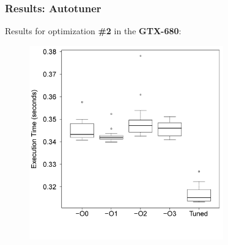 \documentclass[10pt, compress]{beamer}
\begin{document}
\begin{frame}[fragile]
  \frametitle{Results: Autotuner}
  Results for optimization \alert{\bf \#2}
  in the \alert{\bf GTX-680}:

    \begin{figure}[htpb]
        \centering
        \includegraphics[width=0.75\textwidth]{MatMulGPU-GTX-680-Box.eps}
    \end{figure}
\end{frame}
\end{document}
